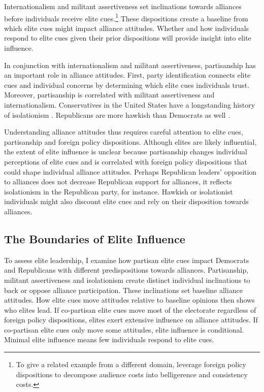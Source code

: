 \documentclass[12pt]{article}
\begin{document}
Internationalism and militant assertiveness set inclinations towards alliances before individuals receive elite cues.\footnote{To give a related example from a different domain, \citet{KertzerBrutger2016} leverage foreign policy dispositions to decompose audience costs into belligerence and consistency costs.}
These dispositions create a baseline from which elite cues might impact alliance attitudes. 
Whether and how individuals respond to elite cues given their prior dispositions will provide insight into elite influence. 


In conjunction with internationalism and militant assertiveness, partisanship has an important role in alliance attitudes. 
First, party identification connects elite cues and individual concerns by determining which elite cues individuals trust.
Moreover, partisanship is correlated with militant assertiveness and internationalism. 
Conservatives in the United States have a longstanding history of isolationism \citep{Kupchan2020}.
Republicans are more hawkish than Democrats as well \citep{Gries2014}. 


Understanding alliance attitudes thus requires careful attention to elite cues, partisanship and foreign policy dispositions. 
Although elites are likely influential, the extent of elite influence is unclear because partisanship changes individual perceptions of elite cues and is correlated with foreign policy dispositions that could shape individual alliance attitudes. 
Perhaps Republican leaders' opposition to alliances does not decrease Republican support for alliances, it reflects isolationism in the Republican party, for instance. 
Hawkish or isolationist individuals might also discount elite cues and rely on their disposition towards alliances. 



\subsection{The Boundaries of Elite Influence}


To assess elite leadership, I examine how partisan elite cues impact Democrats and Republicans with different predispositions towards alliances.
Partisanship, militant assertiveness and isolationism create distinct individual inclinations to back or oppose alliance participation. 
These inclinations set baseline alliance attitudes. 
How elite cues move attitudes relative to baseline opinions then shows who elites lead. 
If co-partisan elite cues move most of the electorate regardless of foreign policy dispositions, elites exert extensive influence on alliance attitudes. 
If co-partisan elite cues only move some attitudes, elite influence is conditional. 
Minimal elite influence means few individuals respond to elite cues. 
\end{document}

